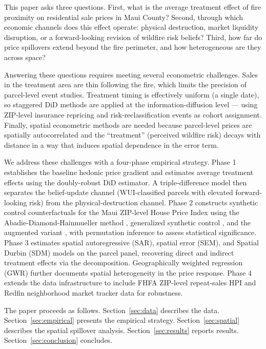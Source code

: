 \documentclass[12pt]{article}
\begin{document}
This paper asks three questions. First, what is the average treatment effect of
fire proximity on residential sale prices in Maui County? Second, through which
economic channels does this effect operate: physical destruction, market liquidity
disruption, or a forward-looking revision of wildfire risk beliefs? Third, how far
do price spillovers extend beyond the fire perimeter, and how heterogeneous are
they across space?

Answering these questions requires meeting several econometric challenges. Sales
in the treatment area are thin following the fire, which limits the precision of
parcel-level event studies. Treatment timing is effectively uniform (a single date),
so staggered DiD methods are applied at the information-diffusion level --- using
ZIP-level insurance repricing and risk-reclassification events as cohort assignment.
Finally, spatial econometric methods are needed because parcel-level prices are
spatially autocorrelated and the ``treatment'' (perceived wildfire risk) decays
with distance in a way that induces spatial dependence in the error term.

We address these challenges with a four-phase empirical strategy. Phase 1
establishes the baseline hedonic price gradient and estimates average treatment
effects using the \citet{CS2021} doubly-robust DiD estimator. A
triple-difference model then separates the belief-update channel (WUI-classified
parcels with elevated forward-looking risk) from the physical-destruction channel.
Phase 2 constructs synthetic control counterfactuals for the Maui ZIP-level House
Price Index using the Abadie-Diamond-Hainmueller method \citep{Abadie2010},
generalized synthetic control \citep{Xu2017}, and the augmented variant
\citep{BenMichael2021}, with permutation inference to assess statistical
significance. Phase 3 estimates spatial autoregressive (SAR), spatial error (SEM),
and Spatial Durbin (SDM) models on the parcel panel, recovering direct and indirect
treatment effects via the \citet{LeSage2009} decomposition. Geographically weighted
regression (GWR) further documents spatial heterogeneity in the price response.
Phase 4 extends the data infrastructure to include FHFA ZIP-level repeat-sales HPI
and Redfin neighborhood market tracker data for robustness.

The paper proceeds as follows. Section~\ref{sec:data} describes the data.
Section~\ref{sec:empirical} presents the empirical strategy.
Section~\ref{sec:spatial} describes the spatial spillover analysis.
Section~\ref{sec:results} reports results.
Section~\ref{sec:conclusion} concludes.
\end{document}
